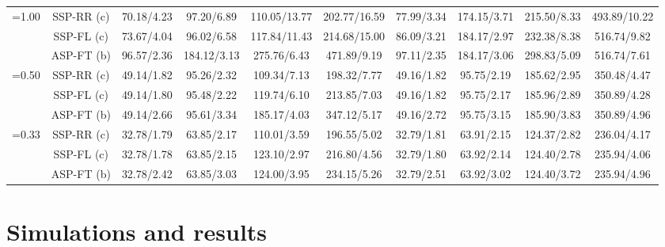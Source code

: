 \documentclass[10pt,twocolumn,journal]{IEEEtran}
\begin{document}
\begin{table*}[t!]
{\begin{tabular}{|c|c|c|c|c|c|c|c|c|c|}
\hline
\multirow{3}{*}{=1.00} & SSP-RR (c) & 70.18/4.23 & 97.20/6.89 & 110.05/13.77 & \cellcolor[gray]{0.8} 202.77/16.59 & 77.99/3.34 & 174.15/3.71 & 215.50/8.33 & \cellcolor[gray]{0.8} 493.89/10.22 \\
& SSP-FL (c) & 73.67/4.04 & 96.02/6.58 & 117.84/11.43 & 214.68/15.00 & 86.09/3.21 & 184.17/2.97 & 232.38/8.38 & 516.74/9.82 \\
& ASP-FT (b) & 96.57/2.36 & 184.12/3.13 & 275.76/6.43 & \cellcolor[gray]{0.9} 471.89/9.19 & 97.11/2.35 & 184.17/3.06 & 298.83/5.09 & \cellcolor[gray]{0.9} 516.74/7.61 \\
\hline
\multirow{3}{*}{=0.50} & SSP-RR (c) & 49.14/1.82 & 95.26/2.32 & 109.34/7.13 & 198.32/7.77 & 49.16/1.82 & 95.75/2.19 & 185.62/2.95 & 350.48/4.47 \\
& SSP-FL (c) &  49.14/1.80 & 95.48/2.22 & 119.74/6.10 & 213.85/7.03 & 49.16/1.82 & 95.75/2.17 & 185.96/2.89 & 350.89/4.28 \\
& ASP-FT (b) & 49.14/2.66 & 95.61/3.34 & 185.17/4.03 & 347.12/5.17 & 49.16/2.72 & 95.75/3.15 & 185.90/3.83 & 350.89/4.96 \\
\hline
\multirow{3}{*}{=0.33} & SSP-RR (c) & 32.78/1.79 & 63.85/2.17 & 110.01/3.59 & 196.55/5.02 & 32.79/1.81 & 63.91/2.15 & 124.37/2.82 & 236.04/4.17 \\
& SSP-FL (c) & \cellcolor[gray]{0.7} 32.78/1.78 & 63.85/2.15 & 123.10/2.97 & 216.80/4.56 & \cellcolor[gray]{0.8} 32.79/1.80 & 63.92/2.14 & 124.40/2.78 & 235.94/4.06 \\
& ASP-FT (b) & 32.78/2.42 & 63.85/3.03 & 124.00/3.95 & 234.15/5.26 & 32.79/2.51 & 63.92/3.02 & 124.40/3.72 & 235.94/4.96 \\
\hline
  \end{tabular}
}
\end{table*}

\section{Simulations and results}
\label{sec:results}
\end{document}

